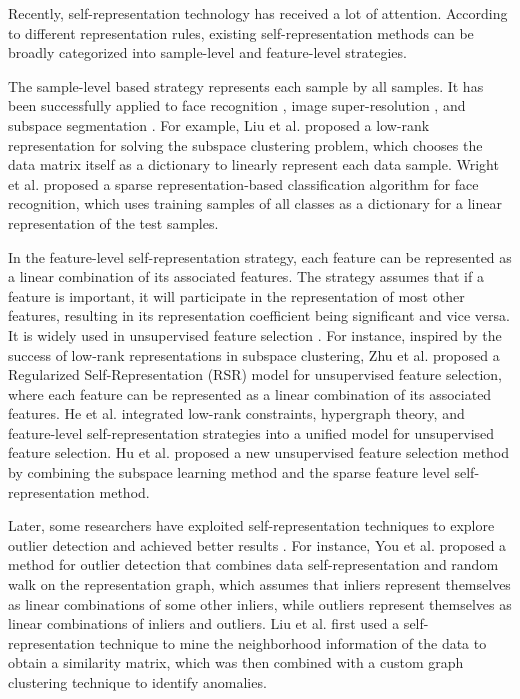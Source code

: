 \documentclass[ASNA,twocolumn]{USG} %
\begin{document}
Recently, self-representation technology has received a lot of attention. According to different representation rules, existing self-representation methods can be broadly categorized into sample-level and feature-level strategies.

The sample-level based strategy represents each sample by all samples. It has been successfully applied to face recognition \cite{4483511}, image super-resolution \cite{yang2010image}, and subspace segmentation \cite{6180173}. For example, Liu et al. \cite{6180173} proposed a low-rank representation for solving the subspace clustering problem, which chooses the data matrix itself as a dictionary to linearly represent each data sample. 
Wright et al. \cite{4483511} proposed a sparse representation-based classification algorithm for face recognition, which uses training samples of all classes as a dictionary for a linear representation of the test samples.

In the feature-level self-representation strategy, each feature can be represented as a linear combination of its associated features.
The strategy assumes that if a feature is important, it will participate in the representation of most other features, resulting in its representation coefficient being significant and vice versa. It is widely used in unsupervised feature selection \cite{zhu2015unsupervised,he2017feature,hu2017graph}. For instance, inspired by the success of low-rank representations in subspace clustering, Zhu et al. \cite{zhu2015unsupervised} proposed a Regularized Self-Representation (RSR) model for unsupervised feature selection, where each feature can be represented as a linear combination of its associated features.
He et al. \cite{he2017feature} integrated low-rank constraints, hypergraph theory, and feature-level self-representation strategies into a unified model for unsupervised feature selection. 
Hu et al. \cite{hu2017graph} proposed a new unsupervised feature selection method by combining the subspace learning method and the sparse feature level self-representation method.

Later, some researchers have exploited self-representation techniques to explore outlier detection and achieved better results \cite{you2017provable,liu2023anomaly}. For instance, You et al. \cite{you2017provable} proposed a method for outlier detection that combines data self-representation and random walk on the representation graph, which assumes that inliers represent themselves as linear combinations of some other inliers, while outliers represent themselves as linear combinations of inliers and outliers.
Liu et al. \cite{liu2023anomaly} first used a self-representation technique to mine the neighborhood information of the data to obtain a similarity matrix, which was then combined with a custom graph clustering technique to identify anomalies.
\end{document}
